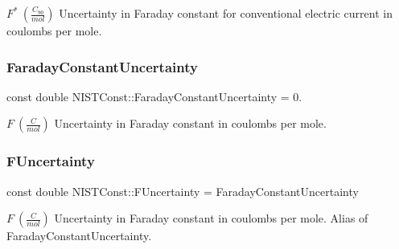 $F^\ast \ (\frac{C_{90}}{mol})$ Uncertainty in Faraday constant for conventional electric current in coulombs per mole. \mbox{\label{group___faraday_constant_ga9b0f9181caac73b346e91602673272c1}} 
\subsubsection{\texorpdfstring{Faraday\+Constant\+Uncertainty}{FaradayConstantUncertainty}}
{\footnotesize\ttfamily const double N\+I\+S\+T\+Const\+::\+Faraday\+Constant\+Uncertainty = 0.}

$F \ (\frac{C}{mol})$ Uncertainty in Faraday constant in coulombs per mole. \mbox{\label{group___faraday_constant_ga00c3ecdf32da676583d7f64f8a6a4e07}} 
\subsubsection{\texorpdfstring{F\+Uncertainty}{FUncertainty}}
{\footnotesize\ttfamily const double N\+I\+S\+T\+Const\+::\+F\+Uncertainty = Faraday\+Constant\+Uncertainty}

$F \ (\frac{C}{mol})$ Uncertainty in Faraday constant in coulombs per mole. Alias of Faraday\+Constant\+Uncertainty. 